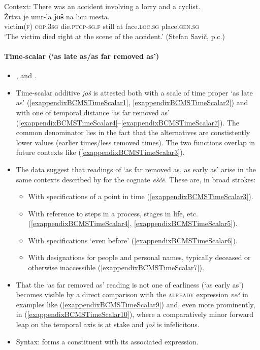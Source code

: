 \begin{exe}
	\ex\label{exAppendixSerbocroatianTemporalFrameAdverbial4}
	Context: There was an accident involving a lorry and a cyclist.\\
	\gll Žrtva je umr-la \textbf{još} na licu mesta.\\
	victim(\textsc{f}) \textsc{cop}.3\textsc{sg} die.\textsc{ptcp}-\textsc{sg}.\textsc{f} still at face.\textsc{loc}.\textsc{sg} place.\textsc{gen}.\textsc{sg}\\
	\glt \lq The victim died right at the scene of the accident.' (Stefan Savič, p.c.)
\end{exe}

\paragraph{Time-scalar (\lq as late as/as far removed as\rq{})}
\label{appendixBCMSTimeScalar}
\begin{itemize}
	\sloppy
	\item \textcite{Buchholz1991}, \textcite[s.v. \textit{još}]{HJP} and \textcite{Prajnkovic2018}.
	\item Time-scalar additive \textit{još} is attested both with a scale of time proper \lq as late as\rq{ }(\ref{exappendixBCMSTimeScalar1}, \ref{exappendixBCMSTimeScalar2}) and with one of temporal distance \lq as far removed as\rq{ }(\ref{exappendixBCMSTimeScalar4}–\ref{exappendixBCMSTimeScalar7}). The common denominator lies in the fact that the alternatives are constistently lower values (earlier times/less removed times). The two functions overlap in future contexts like (\ref{exappendixBCMSTimeScalar3}).
	\item  The data suggest that readings of \lq as far removed as, as early as\rq{ }arise in the same contexts described by \textcite{Mustajoki1988} for the  cognate \mbox{\textit{eščë}}. These are, in broad strokes:
	\begin{itemize}
		\item With specifications of a point in time (\ref{exappendixBCMSTimeScalar3}).
		\item With reference to steps in a process, stages in life, etc. (\ref{exappendixBCMSTimeScalar4}, \ref{exappendixBCMSTimeScalar5}).
		\item With specifications \lq even before' (\ref{exappendixBCMSTimeScalar6}).
		\item With designations for people and personal names, typically deceased or otherwise inaccessible (\ref{exappendixBCMSTimeScalar7}).
	\end{itemize}
	\item That the \lq as far removed as\rq{ }reading is not one of earliness (\lq as early as\rq{}) becomes visible by a direct comparison with the \textsc{already} expression \textit{več} in examples like (\ref{exappendixBCMSTimeScalar9}) and, even more prominently, in (\ref{exappendixBCMSTimeScalar10}), where a comparatively minor forward leap on the temporal axis is at stake and \textit{još} is infelicitous.
	\item Syntax: forms a constituent with its associated expression.
\end{itemize}
